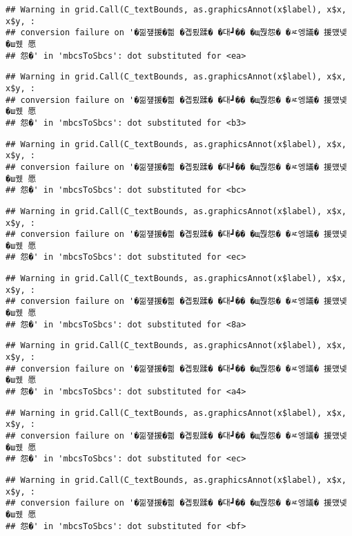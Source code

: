 \documentclass[
]{article}
\begin{document}
\begin{verbatim}
## Warning in grid.Call(C_textBounds, as.graphicsAnnot(x$label), x$x, x$y, :
## conversion failure on '�낆쟾援�쁾 �곕룄蹂� �대┛�� �щ쭩怨� �ㅼ엥議� 援먰넻�ш퀬 愿
## 怨�' in 'mbcsToSbcs': dot substituted for <ea>
\end{verbatim}

\begin{verbatim}
## Warning in grid.Call(C_textBounds, as.graphicsAnnot(x$label), x$x, x$y, :
## conversion failure on '�낆쟾援�쁾 �곕룄蹂� �대┛�� �щ쭩怨� �ㅼ엥議� 援먰넻�ш퀬 愿
## 怨�' in 'mbcsToSbcs': dot substituted for <b3>
\end{verbatim}

\begin{verbatim}
## Warning in grid.Call(C_textBounds, as.graphicsAnnot(x$label), x$x, x$y, :
## conversion failure on '�낆쟾援�쁾 �곕룄蹂� �대┛�� �щ쭩怨� �ㅼ엥議� 援먰넻�ш퀬 愿
## 怨�' in 'mbcsToSbcs': dot substituted for <bc>
\end{verbatim}

\begin{verbatim}
## Warning in grid.Call(C_textBounds, as.graphicsAnnot(x$label), x$x, x$y, :
## conversion failure on '�낆쟾援�쁾 �곕룄蹂� �대┛�� �щ쭩怨� �ㅼ엥議� 援먰넻�ш퀬 愿
## 怨�' in 'mbcsToSbcs': dot substituted for <ec>
\end{verbatim}

\begin{verbatim}
## Warning in grid.Call(C_textBounds, as.graphicsAnnot(x$label), x$x, x$y, :
## conversion failure on '�낆쟾援�쁾 �곕룄蹂� �대┛�� �щ쭩怨� �ㅼ엥議� 援먰넻�ш퀬 愿
## 怨�' in 'mbcsToSbcs': dot substituted for <8a>
\end{verbatim}

\begin{verbatim}
## Warning in grid.Call(C_textBounds, as.graphicsAnnot(x$label), x$x, x$y, :
## conversion failure on '�낆쟾援�쁾 �곕룄蹂� �대┛�� �щ쭩怨� �ㅼ엥議� 援먰넻�ш퀬 愿
## 怨�' in 'mbcsToSbcs': dot substituted for <a4>
\end{verbatim}

\begin{verbatim}
## Warning in grid.Call(C_textBounds, as.graphicsAnnot(x$label), x$x, x$y, :
## conversion failure on '�낆쟾援�쁾 �곕룄蹂� �대┛�� �щ쭩怨� �ㅼ엥議� 援먰넻�ш퀬 愿
## 怨�' in 'mbcsToSbcs': dot substituted for <ec>
\end{verbatim}

\begin{verbatim}
## Warning in grid.Call(C_textBounds, as.graphicsAnnot(x$label), x$x, x$y, :
## conversion failure on '�낆쟾援�쁾 �곕룄蹂� �대┛�� �щ쭩怨� �ㅼ엥議� 援먰넻�ш퀬 愿
## 怨�' in 'mbcsToSbcs': dot substituted for <bf>
\end{verbatim}
\end{document}
